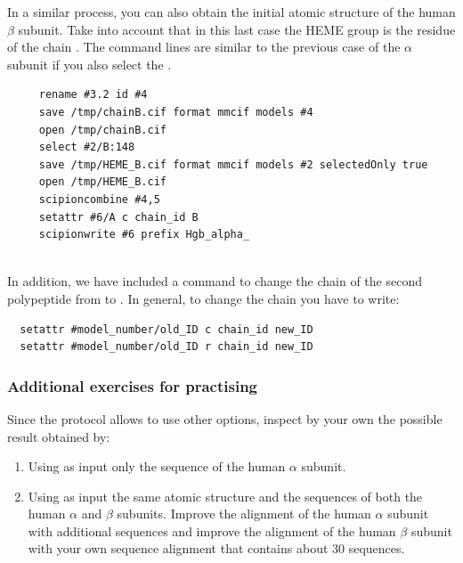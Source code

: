 In a similar process, you can also obtain the initial atomic structure of the human  $\beta$ subunit. Take into account that in this last case the HEME group is the residue  of the chain . The command lines are similar to the previous case of the  $\alpha$ subunit if you also select the  . 
\begin{verbatim}
     rename #3.2 id #4
     save /tmp/chainB.cif format mmcif models #4
     open /tmp/chainB.cif
     select #2/B:148
     save /tmp/HEME_B.cif format mmcif models #2 selectedOnly true 
     open /tmp/HEME_B.cif
     scipioncombine #4,5
     setattr #6/A c chain_id B
     scipionwrite #6 prefix Hgb_alpha_
 \end{verbatim}\\
 
 In addition, we have included a command to change the chain  of the second polypeptide from  to . In general, to change the chain  you have to write:
 \begin{verbatim}
  setattr #model_number/old_ID c chain_id new_ID
  setattr #model_number/old_ID r chain_id new_ID
 \end{verbatim}


\subsubsection*{Additional exercises for practising}
Since the protocol  allows to use other options, inspect by your own the possible result obtained by:\\
\begin{enumerate}
 \item Using as input only the  sequence of the human  $\alpha$ subunit.
 \item Using as input the same atomic structure  and the  sequences of both the human  $\alpha$ and $\beta$ subunits. Improve the alignment of the human  $\alpha$ subunit with additional sequences and improve the alignment of the human  $\beta$ subunit with your own sequence alignment that contains about 30 sequences.
\end{enumerate}


